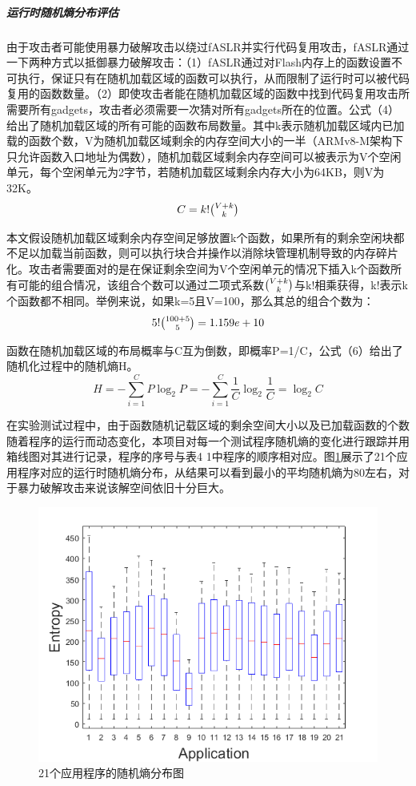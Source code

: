 \documentclass[12pt,a4paper]{ctexart}
\numberwithin{figure}{section}
\begin{document}
\subparagraph{运行时随机熵分布评估}
\par 由于攻击者可能使用暴力破解攻击以绕过fASLR并实行代码复用攻击，fASLR通过一下两种方式以抵御暴力破解攻击：（1）fASLR通过对Flash内存上的函数设置不可执行，保证只有在随机加载区域的函数可以执行，从而限制了运行时可以被代码复用的函数数量。（2）即使攻击者能在随机加载区域的函数中找到代码复用攻击所需要所有gadgets，攻击者必须需要一次猜对所有gadgets所在的位置。公式（4）给出了随机加载区域的所有可能的函数布局数量。其中k表示随机加载区域内已加载的函数个数，V为随机加载区域剩余的内存空间大小的一半（ARMv8-M架构下只允许函数入口地址为偶数），随机加载区域剩余内存空间可以被表示为V个空闲单元，每个空闲单元为2字节，若随机加载区域剩余内存大小为64KB，则V为32K。
\begin{equation}
    C = k!\tbinom{V+k}{k}
\end{equation}

\par 本文假设随机加载区域剩余内存空间足够放置k个函数，如果所有的剩余空闲块都不足以加载当前函数，则可以执行块合并操作以消除块管理机制导致的内存碎片化。攻击者需要面对的是在保证剩余空间为V个空闲单元的情况下插入k个函数所有可能的组合情况，该组合个数可以通过二项式系数$\tbinom{V+k}{k}$与k!相乘获得，k!表示k个函数都不相同。举例来说，如果k=5且V=100，那么其总的组合个数为：
\begin{equation}
    5!\tbinom{100+5}{5}=1.159e+10
\end{equation}
\par 函数在随机加载区域的布局概率与C互为倒数，即概率P=1/C，公式（6）给出了随机化过程中的随机熵H。
\begin{equation}
    H=-\sum_{i=1}^C P\log_2 P = -\sum_{i=1}^{C} \frac{1}{C}\log_2 \frac{1}{C} = \log_2 C
\end{equation}
\par 在实验测试过程中，由于函数随机记载区域的剩余空间大小以及已加载函数的个数随着程序的运行而动态变化，本项目对每一个测试程序随机熵的变化进行跟踪并用箱线图对其进行记录，程序的序号与表4 1中程序的顺序相对应。图\ref{randomEntropy}展示了21个应用程序对应的运行时随机熵分布，从结果可以看到最小的平均随机熵为80左右，对于暴力破解攻击来说该解空间依旧十分巨大。
\begin{figure}[H]
    \label{randomEntropy}
    \centering
    \includegraphics[scale=0.7]{graph/randomEntropy.png}
    \caption{21个应用程序的随机熵分布图}
\end{figure}
\end{document}
